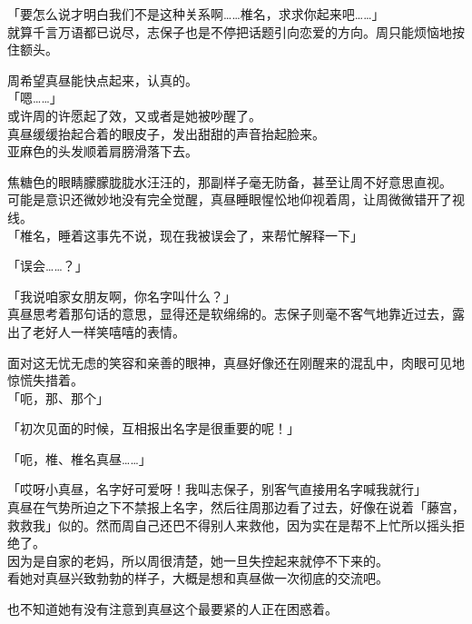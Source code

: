 「要怎么说才明白我们不是这种关系啊……椎名，求求你起来吧……」\\

就算千言万语都已说尽，志保子也是不停把话题引向恋爱的方向。周只能烦恼地按住额头。

周希望真昼能快点起来，认真的。\\

「嗯……」\\

或许周的许愿起了效，又或者是她被吵醒了。\\

真昼缓缓抬起合着的眼皮子，发出甜甜的声音抬起脸来。\\

亚麻色的头发顺着肩膀滑落下去。

焦糖色的眼睛朦朦胧胧水汪汪的，那副样子毫无防备，甚至让周不好意思直视。\\

可能是意识还微妙地没有完全觉醒，真昼睡眼惺忪地仰视着周，让周微微错开了视线。\\

「椎名，睡着这事先不说，现在我被误会了，来帮忙解释一下」

「误会……？」

「我说咱家女朋友啊，你名字叫什么？」\\

真昼思考着那句话的意思，显得还是软绵绵的。志保子则毫不客气地靠近过去，露出了老好人一样笑嘻嘻的表情。

面对这无忧无虑的笑容和亲善的眼神，真昼好像还在刚醒来的混乱中，肉眼可见地惊慌失措着。\\

「呃，那、那个」

「初次见面的时候，互相报出名字是很重要的呢！」

「呃，椎、椎名真昼……」

「哎呀小真昼，名字好可爱呀！我叫志保子，别客气直接用名字喊我就行」\\

真昼在气势所迫之下不禁报上名字，然后往周那边看了过去，好像在说着「藤宫，救救我」似的。然而周自己还巴不得别人来救他，因为实在是帮不上忙所以摇头拒绝了。\\

因为是自家的老妈，所以周很清楚，她一旦失控起来就停不下来的。\\

看她对真昼兴致勃勃的样子，大概是想和真昼做一次彻底的交流吧。

也不知道她有没有注意到真昼这个最要紧的人正在困惑着。\\

